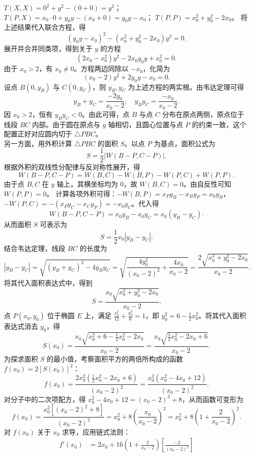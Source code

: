 \begin{solution}
$T(X, X) = 0^2 + y^2 - (0 + 0) = y^2$；
$T(P, X) = x_0 \cdot 0 + y_0 y - (x_0 + 0) = y_0 y - x_0$；
$T(P, P) = x_0^2 + y_0^2 - 2x_0$。
将上述结果代入联合方程，得
\[ (y_0 y - x_0)^2 - (x_0^2 + y_0^2 - 2x_0)y^2 = 0. \]
展开并合并同类项，得到关于 $y$ 的方程
\[ (2x_0 - x_0^2)y^2 - 2x_0 y_0 y + x_0^2 = 0. \]
由于 $x_0 > 2$，有 $x_0 \neq 0$。方程两边同除以 $-x_0$，化简为
\[ (x_0 - 2)y^2 + 2y_0 y - x_0 = 0. \]
设点 $B(0, y_B)$ 与 $C(0, y_C)$，则 $y_B, y_C$ 为上述方程的两实根。由韦达定理可得
\[ y_B + y_C = \frac{-2y_0}{x_0 - 2}, \quad y_B y_C = \frac{-x_0}{x_0 - 2}. \]
因 $x_0 > 2$，恒有 $y_B y_C < 0$。由此可得，点 $B$ 与点 $C$ 分布在原点两侧，原点位于线段 $BC$ 内部。由于圆在原点与 $y$ 轴相切，且圆心位置与点 $P$ 的约束一致，这个配置正好对应圆内切于 $\triangle PBC$。\\
另一方面，用外积计算 $\triangle PBC$ 的面积 $S$。以点 $P$ 为基点，面积公式为
\[ S = \frac{1}{2} \left| W(B-P, C-P) \right|. \]
根据外积的双线性分配律与反对称性展开，得
\[ W(B-P, C-P) = W(B, C) - W(B, P) - W(P, C) + W(P, P). \]
由于点 $B, C$ 在 $y$ 轴上，其横坐标均为 $0$，故 $W(B, C) = 0$。由自反性可知 $W(P, P) = 0$。
计算各项外积可得：$- W(B, P) = x_P y_B - x_B y_P = x_0 y_B$，$- W(P, C) = -(x_P y_C - x_C y_P) = -x_0 y_C$。代入得
\[ W(B-P, C-P) = x_0 y_B - x_0 y_C = x_0 (y_B - y_C). \]
从而面积 $S$ 可表示为
\[ S = \frac{1}{2} x_0 \left| y_B - y_C \right|. \]
结合韦达定理，线段 $BC$ 的长度为
\[ \left| y_B - y_C \right| = \sqrt{(y_B + y_C)^2 - 4y_B y_C} = \sqrt{\frac{4y_0^2}{(x_0 - 2)^2} + \frac{4x_0}{x_0 - 2}} = \frac{2\sqrt{x_0^2 + y_0^2 - 2x_0}}{x_0 - 2}. \]
将其代入面积表达式中，得到
\[ S = \frac{x_0 \sqrt{x_0^2 + y_0^2 - 2x_0}}{x_0 - 2}. \]
点 $P(x_0, y_0)$ 位于椭圆 $E$ 上，满足 $\frac{x_0^2}{12} + \frac{y_0^2}{6} = 1$，即 $y_0^2 = 6 - \frac{1}{2}x_0^2$。将其代入面积表达式消去 $y_0$，得
\[ S(x_0) = \frac{x_0 \sqrt{x_0^2 + 6 - \frac{1}{2}x_0^2 - 2x_0}}{x_0 - 2} = \frac{x_0 \sqrt{\frac{1}{2}x_0^2 - 2x_0 + 6}}{x_0 - 2}. \]
为探求面积 $S$ 的最小值，考察面积平方的两倍所构成的函数 $f(x_0) = 2 \left[S(x_0)\right]^2$：
\[ f(x_0) = \frac{2x_0^2 \left(\frac{1}{2}x_0^2 - 2x_0 + 6\right)}{(x_0 - 2)^2} = \frac{x_0^2 \left(x_0^2 - 4x_0 + 12\right)}{(x_0 - 2)^2}. \]
对分子中的二次项配方，得 $x_0^2 - 4x_0 + 12 = (x_0 - 2)^2 + 8$，从而函数可变形为
\[ f(x_0) = \frac{x_0^2 \left[ (x_0 - 2)^2 + 8 \right]}{(x_0 - 2)^2} = x_0^2 + 8 \left( \frac{x_0}{x_0 - 2} \right)^2 = x_0^2 + 8 \left( 1 + \frac{2}{x_0 - 2} \right)^2. \]
对 $f(x_0)$ 关于 $x_0$ 求导，应用链式法则：
\begin{align*}
f'(x_0) &= 2x_0 + 16 \left( 1 + \frac{2}{x_0 - 2} \right) \left[ \frac{-2}{(x_0 - 2)^2} \right] \\

\end{align*}
\end{solution}
